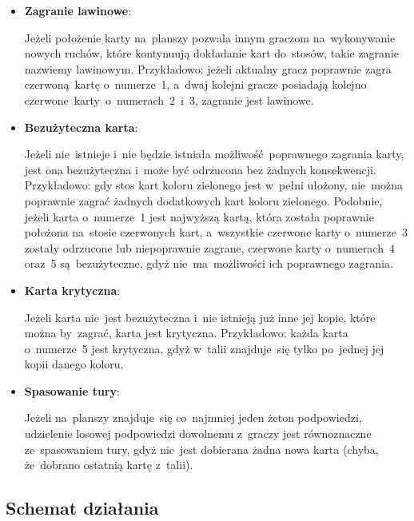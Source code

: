 \documentclass[declaration,shortabstract,inz]{iithesis}
\begin{document}
\begin{itemize}
	\item \textbf{Zagranie lawinowe}:
	
	Jeżeli położenie karty na~planszy pozwala innym graczom na~wykonywanie nowych ruchów, które kontynuują dokładanie kart do~stosów, takie zagranie nazwiemy lawinowym. Przykładowo: jeżeli aktualny gracz poprawnie zagra czerwoną kartę o~numerze~1, a~dwaj kolejni gracze posiadają kolejno czerwone~karty o~numerach~2~i~3, zagranie jest lawinowe.
	
	\item \textbf{Bezużyteczna karta}:
	
	Jeżeli nie~istnieje i~nie będzie istniała możliwość poprawnego zagrania karty, jest ona bezużyteczna i~może być odrzucona bez żadnych konsekwencji. Przykładowo: gdy stos kart koloru zielonego jest w~pełni ułożony, nie~można poprawnie zagrać żadnych dodatkowych kart koloru zielonego. Podobnie, jeżeli karta o~numerze~1 jest najwyższą kartą, która została poprawnie położona na~stosie czerwonych kart, a~wszystkie czerwone karty o~numerze~3 zostały odrzucone lub niepoprawnie zagrane, czerwone karty o~numerach~4 oraz~5 są~bezużyteczne, gdyż nie~ma~możliwości ich poprawnego zagrania.
	
	\item \textbf{Karta krytyczna}:
	
	Jeżeli karta nie~jest bezużyteczna i~nie istnieją już inne jej kopie, które można by~zagrać, karta jest krytyczna. Przykładowo: każda karta o~numerze~5 jest krytyczna, gdyż w~talii znajduje~się tylko po~jednej jej kopii danego koloru.
	
	\item \textbf{Spasowanie tury}:
	
	Jeżeli na~planszy znajduje~się co~najmniej jeden żeton podpowiedzi, udzielenie losowej podpowiedzi dowolnemu z~graczy jest równoznaczne ze~spasowaniem tury, gdyż nie~jest dobierana żadna nowa karta (chyba, że~dobrano ostatnią kartę z~talii).
\end{itemize}

\subsection*{Schemat działania}
\end{document}
